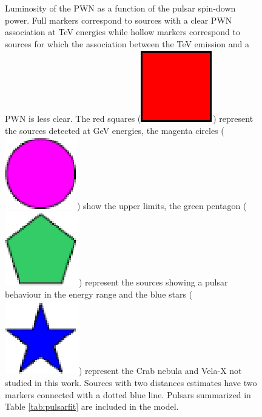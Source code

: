 \begin{figure}[h!]
\caption{Luminosity of the PWN as a function of the pulsar spin-down power. Full markers correspond to sources with a clear PWN association at TeV energies while hollow markers correspond to sources for which the association between the TeV emission and a PWN is less clear. The red squares (\protect\includegraphics[scale=0.25]{figures/carrerouge.eps}) represent the sources detected at GeV energies, the magenta circles (\protect\includegraphics[scale=0.25]{figures/rondmagenta.eps}) show the upper limits, the green pentagon (\protect\includegraphics[scale=0.25]{figures/pentagonevert.eps}) represent the sources showing a pulsar behaviour in the energy range and the blue stars (\protect\includegraphics[scale=0.25]{figures/etoilebleue.eps}) represent the Crab nebula and Vela-X not studied in this work. Sources with two distances estimates have two markers connected with a dotted blue line. Pulsars summarized in Table \ref{tab:pulsarfit} are included in the model. 
\label{fig:dotelpwn}}
\end{figure}

\clearpage
